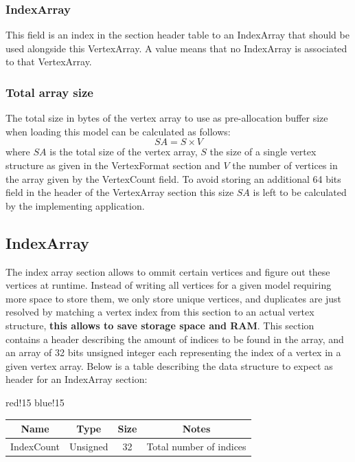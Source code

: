 \subsubsection{IndexArray}
This field is an index in the section header table to an IndexArray that should be used alongside this VertexArray.\newline
A value means that no IndexArray is associated to that VertexArray.

\subsubsection{Total array size}
The total size in bytes of the vertex array to use as pre-allocation buffer size when loading this model can be calculated as follows:
\begin{equation}
    SA = S \times V
\end{equation}
where $SA$ is the total size of the vertex array, $S$ the size of a single vertex structure as given in the VertexFormat section and $V$ the number of vertices in the array given by the VertexCount field.\newline
To avoid storing an additional 64 bits field in the header of the VertexArray section this size $SA$ is left to be calculated by the implementing application.

\subsection{IndexArray}
The index array section allows to ommit certain vertices and figure out these vertices at runtime. Instead of writing all vertices for a given model requiring more space to store them, we only store unique vertices, and duplicates are just resolved by matching a vertex index from this section to an actual vertex structure, \textbf{this allows to save storage space and RAM}.\newline
This section contains a header describing the amount of indices to be found in the array, and an array of 32 bits unsigned integer each representing the index of a vertex in a given vertex array.\newline
Below is a table describing the data structure to expect as header for an IndexArray section:
\begin{center}
    {
        {red!15}
        {blue!15}
        \begin{tabular}{|c|c|c|c|}
            \hline
            \textbf{Name} & \textbf{Type} & \textbf{Size} & \textbf{Notes} \\
    
            \hline\hline
            IndexCount & Unsigned & 32 & Total number of indices \\
            \hline
        \end{tabular}
    }
\end{center}

